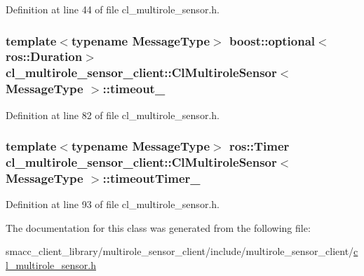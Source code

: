 Definition at line 44 of file cl\+\_\+multirole\+\_\+sensor.\+h.

\subsubsection[{\texorpdfstring{timeout\+\_\+}{timeout_}}]{\setlength{\rightskip}{0pt plus 5cm}template$<$typename Message\+Type$>$ boost\+::optional$<$ros\+::\+Duration$>$ {\bf cl\+\_\+multirole\+\_\+sensor\+\_\+client\+::\+Cl\+Multirole\+Sensor}$<$ Message\+Type $>$\+::timeout\+\_\+}\hypertarget{classcl__multirole__sensor__client_1_1ClMultiroleSensor_ab716f67838f74fb867c7a79c0ef9f35e}{}\label{classcl__multirole__sensor__client_1_1ClMultiroleSensor_ab716f67838f74fb867c7a79c0ef9f35e}


Definition at line 82 of file cl\+\_\+multirole\+\_\+sensor.\+h.

\subsubsection[{\texorpdfstring{timeout\+Timer\+\_\+}{timeoutTimer_}}]{\setlength{\rightskip}{0pt plus 5cm}template$<$typename Message\+Type$>$ ros\+::\+Timer {\bf cl\+\_\+multirole\+\_\+sensor\+\_\+client\+::\+Cl\+Multirole\+Sensor}$<$ Message\+Type $>$\+::timeout\+Timer\+\_\+\hspace{0.3cm}{\ttfamily [private]}}\hypertarget{classcl__multirole__sensor__client_1_1ClMultiroleSensor_aafaee2324858dbf7b7ab8a85d83da53a}{}\label{classcl__multirole__sensor__client_1_1ClMultiroleSensor_aafaee2324858dbf7b7ab8a85d83da53a}


Definition at line 93 of file cl\+\_\+multirole\+\_\+sensor.\+h.



The documentation for this class was generated from the following file\+:\begin{DoxyCompactItemize}
\item 
smacc\+\_\+client\+\_\+library/multirole\+\_\+sensor\+\_\+client/include/multirole\+\_\+sensor\+\_\+client/\hyperlink{cl__multirole__sensor_8h}{cl\+\_\+multirole\+\_\+sensor.\+h}\end{DoxyCompactItemize}
